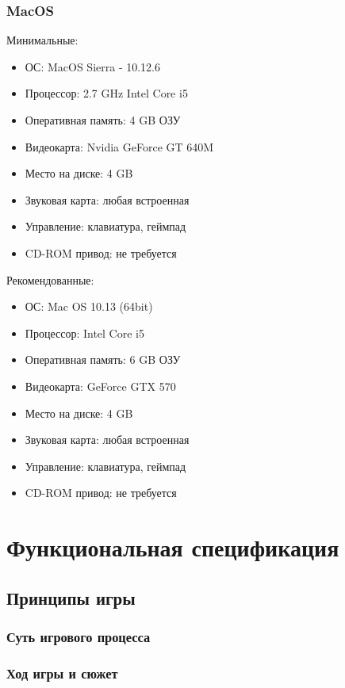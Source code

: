 \documentclass{article}
\begin{document}
\subsubsection{MacOS}
Минимальные:
\begin{itemize}
    \item ОС: MacOS Sierra - 10.12.6
    \item Процессор: 2.7 GHz Intel Core i5
    \item Оперативная память: 4 GB ОЗУ
    \item Видеокарта: Nvidia GeForce GT 640M
    \item Место на диске: 4 GB
    \item Звуковая карта: любая встроенная
    \item Управление: клавиатура, геймпад
    \item CD-ROM привод: не требуется
\end{itemize}

Рекомендованные:
\begin{itemize}
    \item ОС: Mac OS 10.13 (64bit)
    \item Процессор: Intel Core i5
    \item Оперативная память: 6 GB ОЗУ
    \item Видеокарта: GeForce GTX 570
    \item Место на диске: 4 GB
    \item Звуковая карта: любая встроенная
    \item Управление: клавиатура, геймпад
    \item CD-ROM привод: не требуется

\end{itemize}

\section{Функциональная спецификация}

\subsection{Принципы игры}

\subsubsection{Суть игрового процесса}

\subsubsection{Ход игры и сюжет}
\end{document}
